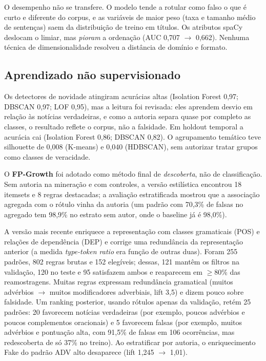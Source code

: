 \documentclass[brazilian,11pt,a4paper]{article}
\begin{document}
O desempenho não se transfere. O modelo tende a rotular como falso o que é curto e diferente do corpus, e as variáveis de maior peso (taxa e tamanho médio de sentenças) saem da distribuição de treino em títulos. Os atributos spaCy deslocam o limiar, mas \emph{pioram} a ordenação (AUC 0,707 $\to$ 0,662). Nenhuma técnica de dimensionalidade resolveu a distância de domínio e formato.

\subsection{Aprendizado não supervisionado}

Os detectores de novidade atingiram acurácias altas (Isolation Forest 0,97; DBSCAN 0,97; LOF 0,95), mas a leitura foi revisada: eles aprendem desvio em relação às notícias verdadeiras, e como a autoria separa quase por completo as classes, o resultado reflete o corpus, não a falsidade. Em holdout temporal a acurácia cai (Isolation Forest 0,86; DBSCAN 0,82). O agrupamento temático teve silhouette de 0,008 (K-means) e 0,040 (HDBSCAN), sem autorizar tratar grupos como classes de veracidade.

O \textbf{FP-Growth} foi adotado como método final de \emph{descoberta}, não de classificação. Sem autoria na mineração e com controles, a versão estilística encontrou 18 itemsets e 8 regras destacadas; a avaliação estratificada mostrou que a associação agregada com o rótulo vinha da autoria (um padrão com 70,3\% de falsas no agregado tem 98,9\% no estrato sem autor, onde o baseline já é 98,0\%).

A versão mais recente enriquece a representação com classes gramaticais (POS) e relações de dependência (DEP) e corrige uma redundância da representação anterior (a medida \textit{type-token ratio} era função de outras duas). Foram 255 padrões, 802 regras brutas e 152 elegíveis; dessas, 121 mantêm os filtros na validação, 120 no teste e 95 satisfazem ambos e reaparecem em $\ge$80\% das reamostragens. Muitas regras expressam redundância gramatical (muitos advérbios $\to$ muitos modificadores adverbiais, lift 3,5) e dizem pouco sobre falsidade. Um ranking posterior, usando rótulos apenas da validação, retém 25 padrões: 20 favorecem notícias verdadeiras (por exemplo, poucos advérbios e poucos complementos oracionais) e 5 favorecem falsas (por exemplo, muitos advérbios e pontuação alta, com 91,5\% de falsas em 106 ocorrências, mas redescoberta de só 37\% no treino). Ao estratificar por autoria, o enriquecimento Fake do padrão ADV alto desaparece (lift 1,245 $\to$ 1,01).
\end{document}
